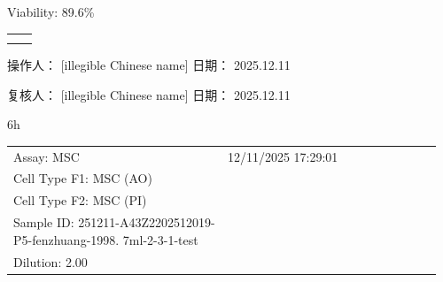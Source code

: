 \documentclass[UTF8,10pt,a4paper,fontset=fandol]{ctexart}
\newcommand{\fieldvalue}[1]{#1}
\newcommand{\handwritten}[1]{#1}
\begin{document}
\medskip

Viability:
\fieldvalue{89.6\%}

\medskip

\begin{center}
\begin{tabular}{@{}c@{\qquad\qquad}c@{}}
\fbox{\parbox[c][3.0cm][c]{0.34\linewidth}{\centering
}} &
\fbox{\parbox[c][3.0cm][c]{0.34\linewidth}{\centering
}} \\[1.2cm]
\fbox{\parbox[c][3.0cm][c]{0.34\linewidth}{\centering
}} &
\fbox{\parbox[c][3.0cm][c]{0.34\linewidth}{\centering
}}
\end{tabular}
\end{center}

\vfill

\noindent
操作人：
\fieldvalue{\handwritten{[illegible Chinese name]}}
\hfill
日期：
\fieldvalue{\handwritten{2025.12.11}}

\noindent
复核人：
\fieldvalue{\handwritten{[illegible Chinese name]}}
\hfill
日期：
\fieldvalue{\handwritten{2025.12.11}}

\vspace{1cm}

\handwritten{6h}

\newpage

\noindent
\begin{tabular}{@{}p{0.48\linewidth}p{0.48\linewidth}@{}}
Assay:
\fieldvalue{MSC}
&
\fieldvalue{12/11/2025 17:29:01}
\\[0.7em]
Cell Type F1:
\fieldvalue{MSC (AO)}
&
\\[0.7em]
Cell Type F2:
\fieldvalue{MSC (PI)}
&
\\[0.7em]
Sample ID:
\fieldvalue{251211-A43Z2202512019-P5-fenzhuang-1998. 7ml-2-3-1-test}
&
\\[0.7em]
Dilution:
\fieldvalue{2.00}
&
\end{tabular}
\end{document}
